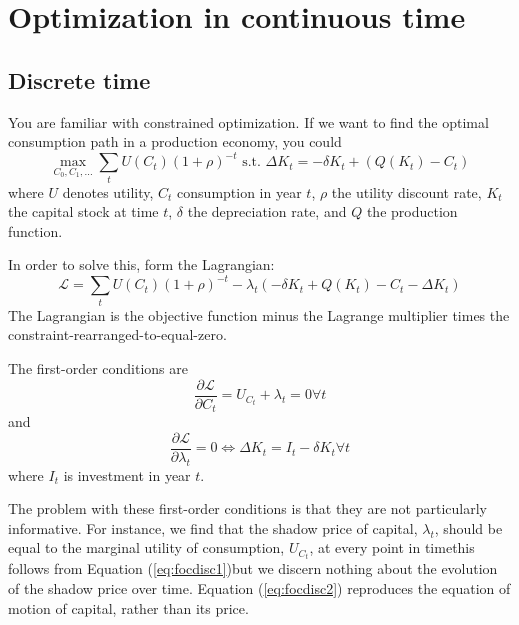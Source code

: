 \appendix
\motto{}
\chapter{Optimization in continuous time}

\section{Discrete time}
You are familiar with constrained optimization. If we want to find the optimal consumption path in a production economy, you could
\begin{equation}
\label{eq:discr}
	\max_{C_0, C_1, ...} \sum_t U(C_t) (1+\rho)^{-t} \text{ s.t. } \Delta K_t = -\delta K_t + (Q(K_t) - C_t)
\end{equation}
where $U$ denotes utility, $C_t$ consumption in year $t$, $\rho$ the utility discount rate, $K_t$ the capital stock at time $t$, $\delta$ the depreciation rate, and $Q$ the production function.

In order to solve this, form the Lagrangian:
\begin{equation}
	\mathcal{L} =  \sum_t U(C_t) (1+\rho)^{-t} -\lambda_t \left ( -\delta K_t + Q(K_t) - C_t - \Delta K_t \right )
\end{equation}
The Lagrangian is the objective function minus the Lagrange multiplier times the constraint-rearranged-to-equal-zero.

The first-order conditions are
\begin{equation}
\label{eq:focdisc1}
	\frac{\partial \mathcal{L}}{\partial C_t} =  U_{C_t} + \lambda_t = 0 \forall t
\end{equation}
and
\begin{equation}
\label{eq:focdisc2}
	\frac{\partial \mathcal{L}}{\partial \lambda_t} = 0 \Leftrightarrow \Delta K_t = I_t -\delta K_t \forall t
\end{equation}
where $I_t$ is investment in year $t$.

The problem with these first-order conditions is that they are not particularly informative. For instance, we find that the shadow price of capital, $\lambda_t$, should be equal to the marginal utility of consumption, $U_{C_t}$, at every point in time\textemdash this follows from Equation (\ref{eq:focdisc1})\textemdash but we discern nothing about the evolution of the shadow price over time. Equation (\ref{eq:focdisc2}) reproduces the equation of motion of capital, rather than its price.

